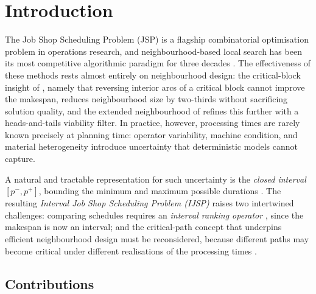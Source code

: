\documentclass[preprint,12pt]{elsarticle}
\begin{document}

\section{Introduction}
\label{sec:intro}

The Job Shop Scheduling Problem (JSP) is a flagship combinatorial optimisation problem in operations research, and neighbourhood-based local search has been its most competitive algorithmic paradigm for three decades \cite{vanLaarhoven1992,Nowicki1996,Nowicki2005}. The effectiveness of these methods rests almost entirely on neighbourhood design: the critical-block insight of \cite{Nowicki1996}, namely that reversing interior arcs of a critical block cannot improve the makespan, reduces neighbourhood size by two-thirds without sacrificing solution quality, and the extended neighbourhood of \cite{Nowicki2005} refines this further with a heads-and-tails viability filter. In practice, however, processing times are rarely known precisely at planning time: operator variability, machine condition, and material heterogeneity introduce uncertainty that deterministic models cannot capture.

A natural and tractable representation for such uncertainty is the \emph{closed interval} $[p^-, p^+]$, bounding the minimum and maximum possible durations \cite{Moore2009,Lei2012c}. The resulting \emph{Interval Job Shop Scheduling Problem (IJSP)} raises two intertwined challenges: comparing schedules requires an \emph{interval ranking operator} \cite{Bustince2013,Karmakar2012}, since the makespan is now an interval; and the critical-path concept that underpins efficient neighbourhood design must be reconsidered, because different paths may become critical under different realisations of the processing times \cite{Dubois2003,Artigues2015,GonzalezRodriguez2008}.

\subsection{Contributions}
\label{sec:contributions}
\end{document}

